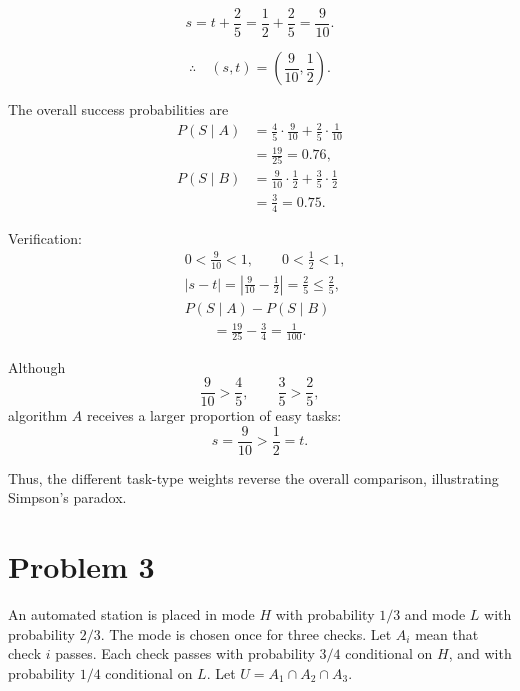 \documentclass[11pt,a4paper]{article}
\begin{document}
\begin{enumerate}
\[
s=t+\frac25
=\frac12+\frac25
=\frac9{10}.
\]

\[
\therefore\quad
(s,t)=\left(\frac9{10},\frac12\right).
\]

The overall success probabilities are
\[
\begin{aligned}
P(S\mid A)
&=\frac45\cdot\frac9{10}
+\frac25\cdot\frac1{10}\\
&=\frac{19}{25}=0.76,\\[6pt]
P(S\mid B)
&=\frac9{10}\cdot\frac12
+\frac35\cdot\frac12\\
&=\frac34=0.75.
\end{aligned}
\]

Verification:
\[
\begin{aligned}
&0<\frac9{10}<1,\qquad
0<\frac12<1,\\[4pt]
&|s-t|
=\left|\frac9{10}-\frac12\right|
=\frac25\leq\frac25,\\[4pt]
&P(S\mid A)-P(S\mid B)\\
&\qquad=\frac{19}{25}-\frac34
=\frac1{100}.
\end{aligned}
\]

Although
\[
\frac9{10}>\frac45,
\qquad
\frac35>\frac25,
\]
algorithm $A$ receives a larger proportion of easy
tasks:
\[
s=\frac9{10}>\frac12=t.
\]

Thus, the different task-type weights reverse
the overall comparison, illustrating Simpson's
paradox.

\end{enumerate}


\clearpage
\section*{Problem 3}

An automated station is placed in mode $H$ with probability $1/3$
and mode $L$ with probability $2/3$. The mode is chosen once for
three checks. Let $A_i$ mean that check $i$ passes. Each check
passes with probability $3/4$ conditional on $H$, and with
probability $1/4$ conditional on $L$.
Let $U=A_1\cap A_2\cap A_3$.
\end{document}
